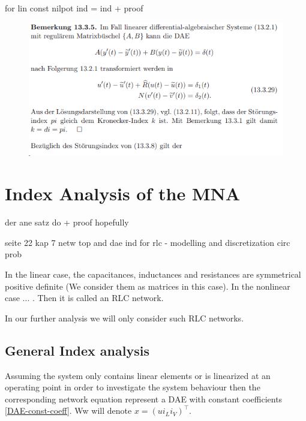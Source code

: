 \documentclass[11pt,titlepage]{article}
\begin{document}
			for lin const nilpot ind  = ind + proof
			
			\begin{figure}[H]
				\centering
				\includegraphics[width=0.7\linewidth]{screenshot005}
				\caption{}
				\label{fig:screenshot005}
			\end{figure}
			
		
		
	\newpage
	\section{Index Analysis of the MNA}
		
		der ane satz do + proof hopefully
		
		seite 22 kap 7 netw top and dae ind for rlc - modelling and discretization circ prob
		
		In the linear case, the capacitances, inductances and resistances are symmetrical positive definite (We consider them as matrices in this case). In the nonlinear case ... . Then it is called an RLC network.
		
		In our further analysis we will only consider such RLC networks.
		
		\subsection{General Index analysis}
		
			Assuming the system only contains linear elements or is linearized at an operating point in order to investigate the system behaviour then the corresponding network equation represent a DAE with constant coefficients \ref{DAE-const-coeff}. Ww will denote $x=(u i_L i_V)^\top$.
			
\end{document}
